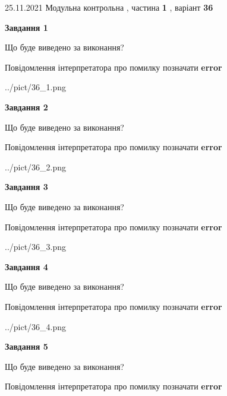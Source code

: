 \documentclass[10pt, ukrainian]{article}
\begin{document}
{25.11.2021 Модульна контрольна , частина \textbf { 1 }, варіант  \No \textbf { 36 }\par}
{
\begin {large}

{\begin {center}\textbf{Завдання 1}\end {center}}\par
Що буде виведено за виконання? \par
Повідомлення інтерпретатора про помилку позначати \textbf{error}

\begin{center}
	{../pict/36_1.png}
\end{center}
\newpage

{\begin {center}\textbf{Завдання 2}\end {center}}\par
Що буде виведено за виконання? \par
Повідомлення інтерпретатора про помилку позначати \textbf{error}

\begin{center}
	{../pict/36_2.png}
\end{center}
\newpage

{\begin {center}\textbf{Завдання 3}\end {center}}\par
Що буде виведено за виконання? \par
Повідомлення інтерпретатора про помилку позначати \textbf{error}

\begin{center}
	{../pict/36_3.png}
\end{center}
\newpage

{\begin {center}\textbf{Завдання 4}\end {center}}\par
Що буде виведено за виконання? \par
Повідомлення інтерпретатора про помилку позначати \textbf{error}

\begin{center}
	{../pict/36_4.png}
\end{center}
\newpage

{\begin {center}\textbf{Завдання 5}\end {center}}\par
Що буде виведено за виконання? \par
Повідомлення інтерпретатора про помилку позначати \textbf{error}


\end{large}}
\end{document}
